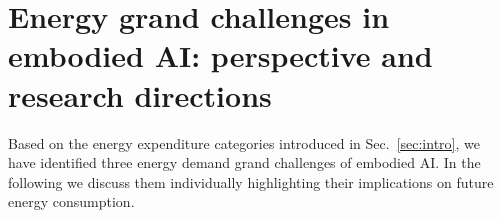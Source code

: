 \section{Energy grand challenges in embodied AI: perspective and research directions}\label{sec:energy_grand_challenges}
Based on the energy expenditure categories introduced in Sec.~\ref{sec:intro},  we have identified three energy demand grand challenges of embodied AI. In the following we discuss them individually highlighting their implications on future energy consumption.

